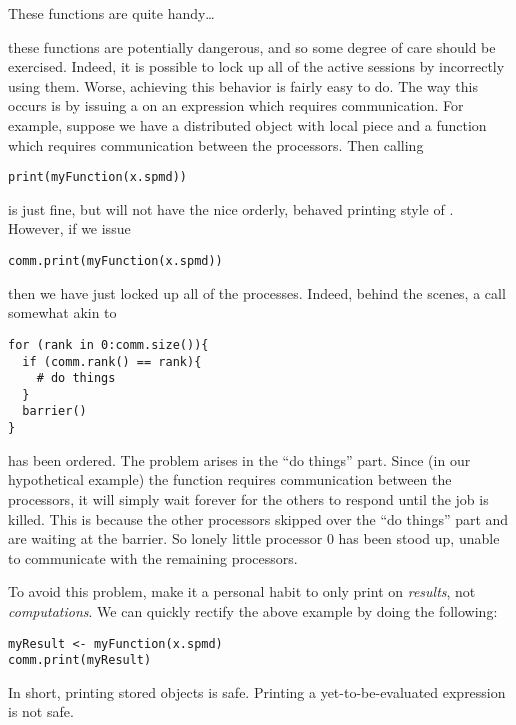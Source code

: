 These functions are quite handy\dots
\begin{center}
\colorbox{yellow}{\Huge \color{red}{\#\#\#\#\# HOWEVER \#\#\#\#\# }}  
\end{center}
these functions are potentially dangerous, and so some degree of care should be exercised.  Indeed, it is possible to lock up all of the active  sessions by incorrectly using them.  Worse, achieving this behavior is fairly easy to do.  The way this occurs is by issuing a  on an expression which requires communication.  For example, suppose we have a distributed object with local piece  and a function  which requires communication between the processors.  Then calling
\begin{lstlisting}[language=rr,title=A Cautionary Tale of Printing in Parallel (1 of 3)]
print(myFunction(x.spmd)) 
\end{lstlisting}
is just fine, but will not have the nice orderly, behaved printing style of .  However, if we issue
\begin{lstlisting}[language=rr,title=A Cautionary Tale of Printing in Parallel (2 of 3)]
comm.print(myFunction(x.spmd)) 
\end{lstlisting}
then we have just locked up all of the  processes.  Indeed, behind the scenes, a call somewhat akin to 
\begin{lstlisting}[language=rr]
for (rank in 0:comm.size()){
  if (comm.rank() == rank){
    # do things
  }
  barrier()
}
\end{lstlisting}
has been ordered.  The problem arises in the ``do things'' part.  Since (in our hypothetical example) the function  requires communication between the processors, it will simply wait forever for the others to respond until the job is killed.  This is because the other processors skipped over the ``do things'' part and are waiting at the barrier.  So lonely little processor 0 has been stood up, unable to communicate with the remaining processors.

To avoid this problem, make it a personal habit to only print on \emph{results}, not \emph{computations}.  We can quickly rectify the above example by doing the following:
\begin{lstlisting}[language=rr,title=A Cautionary Tale of Printing in Parallel (3 of 3)]
myResult <- myFunction(x.spmd)
comm.print(myResult)
\end{lstlisting}

In short, printing stored objects is safe.  Printing a yet-to-be-evaluated expression is not safe.





